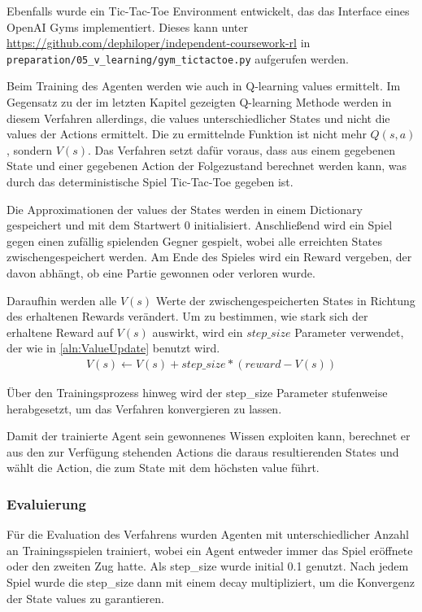 \documentclass[11pt]{scrartcl}
\begin{document}
Ebenfalls wurde ein Tic-Tac-Toe Environment entwickelt, das das Interface eines OpenAI
Gyms implementiert. Dieses kann unter
\url{https://github.com/dephiloper/independent-coursework-rl} in
\lstinline!preparation/05_v_learning/gym_tictactoe.py! aufgerufen werden.

Beim Training des Agenten werden wie auch in Q-learning values ermittelt. Im Gegensatz zu
der im letzten Kapitel gezeigten Q-learning Methode werden in diesem Verfahren allerdings,
die values unterschiedlicher States und nicht die values der Actions ermittelt. Die zu
ermittelnde Funktion ist nicht mehr $Q(s, a)$, sondern $V(s)$. Das Verfahren setzt dafür
voraus, dass aus einem gegebenen State und einer gegebenen Action der Folgezustand berechnet
werden kann, was durch das deterministische Spiel Tic-Tac-Toe gegeben ist.

Die Approximationen der values der States werden in einem Dictionary gespeichert und mit
dem Startwert 0 initialisiert. Anschließend wird ein Spiel gegen einen zufällig spielenden
Gegner gespielt, wobei alle erreichten States zwischengespeichert werden. Am Ende des
Spieles wird ein Reward vergeben, der davon abhängt, ob eine Partie gewonnen oder verloren
wurde.

Daraufhin werden alle $V(s)$ Werte der zwischengespeicherten States in Richtung des
erhaltenen Rewards verändert. Um zu bestimmen, wie stark sich der erhaltene Reward auf
$V(s)$ auswirkt, wird ein $step\_size$ Parameter verwendet, der wie in
\autoref{aln:ValueUpdate} benutzt wird.
\begin{align}
  V(s) \leftarrow V(s) + step\_size * (reward - V(s))
  \label{aln:ValueUpdate}
\end{align}
\noindent

Über den Trainingsprozess hinweg wird der step\_size Parameter stufenweise herabgesetzt,
um das Verfahren konvergieren zu lassen.

Damit der trainierte Agent sein gewonnenes Wissen exploiten kann, berechnet er aus den
zur Verfügung stehenden Actions die daraus resultierenden States und wählt die Action, die
zum State mit dem höchsten value führt.

\subsubsection{Evaluierung}
Für die Evaluation des Verfahrens wurden Agenten mit unterschiedlicher Anzahl an
Trainingsspielen trainiert, wobei ein Agent entweder immer das Spiel eröffnete oder
den zweiten Zug hatte. Als step\_size wurde initial 0.1 genutzt. Nach jedem Spiel wurde
die step\_size dann mit einem decay multipliziert, um die Konvergenz der State values
zu garantieren.
\end{document}
